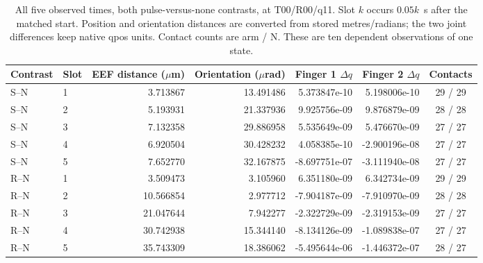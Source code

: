 \begin{table}[!h]
\centering
\caption{All five observed times, both pulse-versus-none contrasts, at T00/R00/q11. Slot $k$ occurs $0.05k$~s after the matched start. Position and orientation distances are converted from stored metres/radians; the two joint differences keep native qpos units. Contact counts are arm / N. These are ten dependent observations of one state.}
\label{tab:physical-all}
\begin{tabular}{@{}llrrrrc@{}}\toprule
Contrast & Slot & EEF distance ($\mu$m) & Orientation ($\mu$rad) & Finger 1 $\Delta q$ & Finger 2 $\Delta q$ & Contacts\\\midrule
S--N & 1 & 3.713867 & 13.491486 & 5.373847e-10 & 5.198006e-10 & 29 / 29\\
S--N & 2 & 5.193931 & 21.337936 & 9.925756e-09 & 9.876879e-09 & 28 / 28\\
S--N & 3 & 7.132358 & 29.886958 & 5.535649e-09 & 5.476670e-09 & 27 / 27\\
S--N & 4 & 6.920504 & 30.428232 & 4.058385e-10 & -2.900196e-08 & 27 / 27\\
S--N & 5 & 7.652770 & 32.167875 & -8.697751e-07 & -3.111940e-08 & 27 / 27\\
R--N & 1 & 3.509473 & 3.105960 & 6.351180e-09 & 6.342734e-09 & 29 / 29\\
R--N & 2 & 10.566854 & 2.977712 & -7.904187e-09 & -7.910970e-09 & 28 / 28\\
R--N & 3 & 21.047644 & 7.942277 & -2.322729e-09 & -2.319153e-09 & 27 / 27\\
R--N & 4 & 30.742938 & 15.344140 & -8.134126e-09 & -1.089838e-07 & 27 / 27\\
R--N & 5 & 35.743309 & 18.386062 & -5.495644e-06 & -1.446372e-07 & 28 / 27\\
\bottomrule
\end{tabular}
\end{table}
